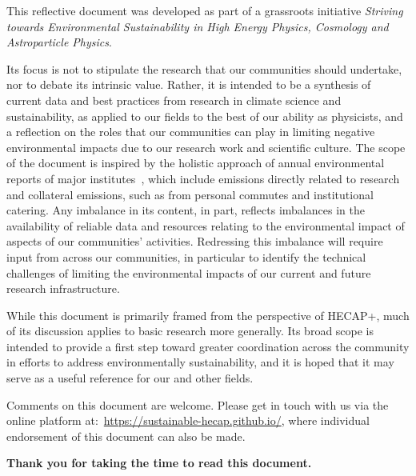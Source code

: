 \documentclass[../SustainableHEP.tex]{subfiles}
\begin{document}
        This reflective document was developed as part of a grassroots initiative {\it Striving towards Environmental Sustainability in High Energy Physics, Cosmology and Astroparticle Physics}.
        
        Its focus is not to stipulate the research that our communities should undertake, nor to debate its intrinsic value.  Rather, it is intended to be a synthesis of current data and best practices from research in climate science and sustainability, as applied to our fields to the best of our ability as physicists, and a reflection on the roles that our communities can play in limiting negative environmental impacts due to our research work and scientific culture. 
        The scope of the document is inspired by the holistic approach of annual environmental reports of major institutes~\cite{Environment:2737239,FermilabEnvReport,EPFL}, which include emissions directly related to research and collateral emissions, such as from personal commutes and institutional catering. Any imbalance in its content, in part, reflects imbalances in the availability of reliable data and resources relating to the environmental impact of aspects of our communities' activities.
        Redressing this imbalance will require input from across our communities, in particular to identify the technical challenges of limiting the environmental impacts of our current and future research infrastructure.

        While this document is primarily framed from the perspective of HECAP+, much of its discussion applies to basic research more generally. Its broad scope is intended to provide a first step toward greater coordination across the community in efforts to address environmentally sustainability, and it is hoped that it may serve as a useful reference for our and other fields.
        
        Comments on this document are welcome. Please get in touch with us via the online platform at:~\url{https://sustainable-hecap.github.io/}, where individual endorsement of this document can also be made.
        
        \noindent \textbf{Thank you for taking the time to read this document.}
        
\end{document}

